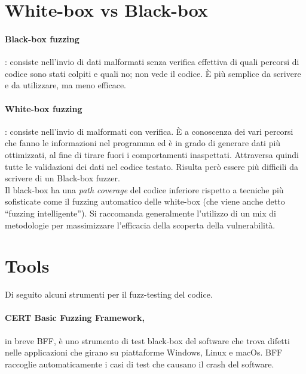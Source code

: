 \section{White-box vs Black-box}

\paragraph{Black-box fuzzing}: consiste nell'invio di dati malformati senza verifica
effettiva di quali percorsi di codice sono stati colpiti e quali no; non vede il codice.
È più semplice da scrivere e da utilizzare, ma meno efficace.

\paragraph{White-box fuzzing}: consiste nell'invio di malformati con verifica.
È a conoscenza dei vari percorsi che fanno le informazioni nel programma ed è in grado di
generare dati più ottimizzati, al fine di tirare fuori i comportamenti inaspettati.
Attraversa quindi tutte le validazioni dei dati nel codice testato.
Risulta però essere più difficili da scrivere di un Black-box fuzzer.\\

Il black-box ha una \textit{path coverage} del codice inferiore rispetto a tecniche più
sofisticate come il fuzzing automatico delle white-box
(che viene anche detto “fuzzing intelligente”).
Si raccomanda generalmente l'utilizzo di un mix di metodologie per massimizzare
l'efficacia della scoperta della vulnerabilità.

\section{Tools}

Di seguito alcuni strumenti per il fuzz-testing del codice.

\paragraph{CERT Basic Fuzzing Framework,} in breve BFF, è uno strumento di test
black-box del software che trova difetti nelle applicazioni che girano su piattaforme Windows,
Linux e macOs. BFF raccoglie automaticamente i casi di test che causano il crash del software.

